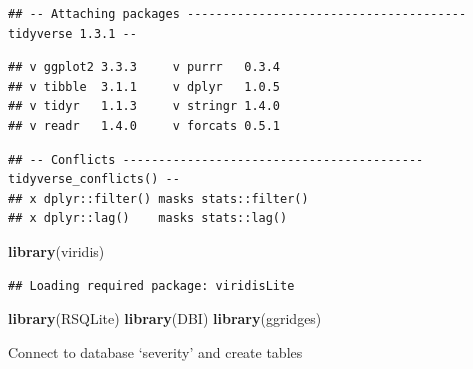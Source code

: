 \documentclass[]{book}
\newenvironment{Shaded}{\begin{snugshade}}{\end{snugshade}}
\newcommand{\KeywordTok}[1]{\textcolor[rgb]{0.13,0.29,0.53}{\textbf{#1}}}
\newcommand{\NormalTok}[1]{#1}
\begin{document}
\begin{verbatim}
## -- Attaching packages --------------------------------------- tidyverse 1.3.1 --
\end{verbatim}

\begin{verbatim}
## v ggplot2 3.3.3     v purrr   0.3.4
## v tibble  3.1.1     v dplyr   1.0.5
## v tidyr   1.1.3     v stringr 1.4.0
## v readr   1.4.0     v forcats 0.5.1
\end{verbatim}

\begin{verbatim}
## -- Conflicts ------------------------------------------ tidyverse_conflicts() --
## x dplyr::filter() masks stats::filter()
## x dplyr::lag()    masks stats::lag()
\end{verbatim}

\begin{Shaded}
\begin{Highlighting}[]
\KeywordTok{library}\NormalTok{(viridis)}
\end{Highlighting}
\end{Shaded}

\begin{verbatim}
## Loading required package: viridisLite
\end{verbatim}

\begin{Shaded}
\begin{Highlighting}[]
\KeywordTok{library}\NormalTok{(RSQLite)}
\KeywordTok{library}\NormalTok{(DBI)}
\KeywordTok{library}\NormalTok{(ggridges)}
\end{Highlighting}
\end{Shaded}

Connect to database `severity' and create tables
\end{document}
